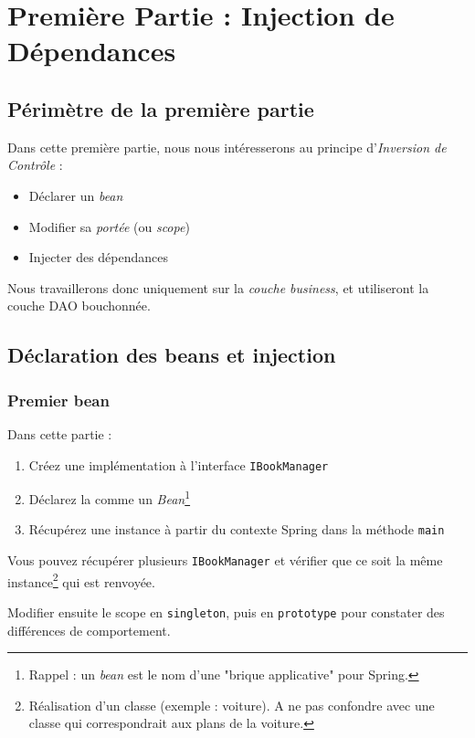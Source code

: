\documentclass[small,algo]{dushClass}
\begin{document}
\section{Première Partie : Injection de Dépendances}

\subsection{Périmètre de la première partie}
Dans cette première partie, nous nous intéresserons au principe d'\emph{Inversion de Contrôle} :
\begin{itemize}
\item Déclarer un \emph{bean}
\item Modifier sa \emph{portée} (ou \emph{scope})
\item Injecter des dépendances\\
\end{itemize}

Nous travaillerons donc uniquement sur la \emph{couche business}, et utiliseront la couche DAO bouchonnée.

\subsection{Déclaration des beans et injection}

\subsubsection{Premier bean}

Dans cette partie :
\begin{enumerate}
\item Créez une implémentation à l'interface \texttt{IBookManager}
\item Déclarez la comme un \emph{Bean}\footnote{Rappel : un \emph{bean} est le nom d'une "brique applicative" pour Spring.}
\item Récupérez une instance à partir du contexte Spring dans la méthode \texttt{main}\\
\end{enumerate}

Vous pouvez récupérer plusieurs \texttt{IBookManager} et vérifier que ce soit la même instance\footnote{Réalisation d'un classe (exemple : voiture). A ne pas confondre avec une classe qui correspondrait aux plans de la voiture.} qui est renvoyée.\par
Modifier ensuite le scope en \texttt{singleton}, puis en \texttt{prototype} pour constater des différences de comportement.
\end{document}
